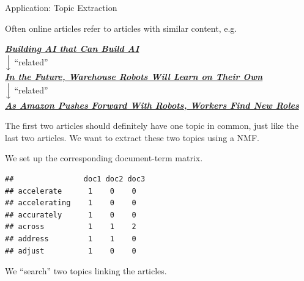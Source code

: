 \begin{vbframe}{Application: Topic Extraction}

Often online articles refer to articles with similar content, e.g.

\begin{center}
	\textbf{\emph{\href{https://www.nytimes.com/2017/11/05/technology/machine-learning-artificial-intelligence-ai.html?rref=collection\%2Fsectioncollection\%2Ftechnology&action=click&contentCollection=technology&region=rank&module=package&version=highlights&contentPlacement=2&pgtype=sectionfront}{Building AI that Can Build AI}}} \\
	$\Big\downarrow$ \footnotesize{\enquote{related}}\\
	\normalsize \textbf{	\emph{\href{https://www.nytimes.com/2017/09/10/business/warehouse-robots-learning.html?action=click&contentCollection=Technology&module=RelatedCoverage&region=Marginalia&pgtype=article}{In the Future, Warehouse Robots Will Learn on Their Own}}} \\
	$\Big\downarrow$ \footnotesize \enquote{related}\\
	\normalsize\textbf{	\emph{\href{https://www.nytimes.com/2017/09/10/technology/amazon-robots-workers.html?action=click&contentCollection=Business\%20Day&module=RelatedCoverage&region=Marginalia&pgtype=article}{As Amazon Pushes Forward With Robots, Workers Find New Roles}}}
\end{center}

The first two articles should definitely have one topic in common, just like the last two articles. We want to extract these two topics using a NMF.

\framebreak

We set up the corresponding document-term matrix.

\lz

\footnotesize
\begin{verbatim}
##                doc1 doc2 doc3
## accelerate      1    0    0
## accelerating    1    0    0
## accurately      1    0    0
## across          1    1    2
## address         1    1    0
## adjust          1    0    0
\end{verbatim}




\framebreak

We \enquote{search} two topics linking the articles.
\vspace{0.2cm}


\end{vbframe}

